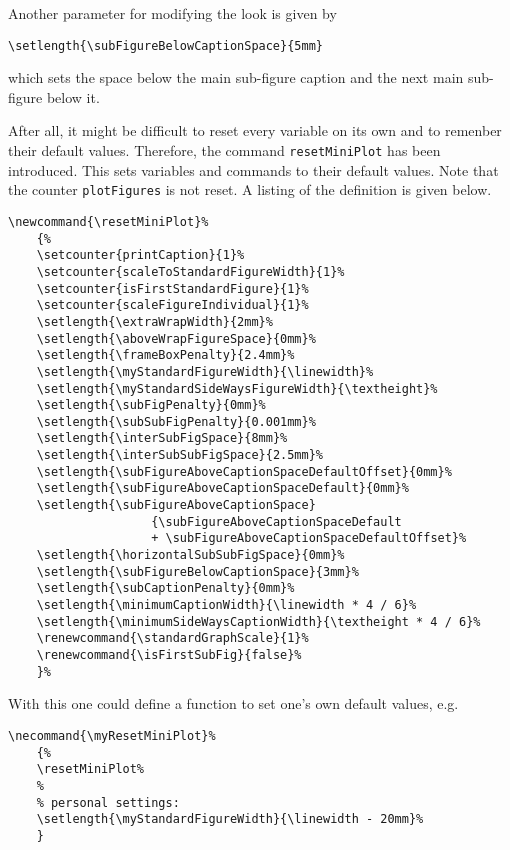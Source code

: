 \documentclass[12pt,a4paper]{article}
\newcommand{\comm}[1]{\texttt{#1}}
\begin{document}
Another parameter for modifying the look is given by

\begin{verbatim}
\setlength{\subFigureBelowCaptionSpace}{5mm}
\end{verbatim}

which sets the space below the main sub-figure caption and the next 
main sub-figure below it.

After all, it might be difficult to reset every variable on its 
own and to remenber their default values. Therefore, the 
command \comm{resetMiniPlot} has been introduced. This 
sets variables and commands to their default values. Note 
that the counter \comm{plotFigures} is not reset. A listing
of the definition is given below.


\begin{verbatim}
\newcommand{\resetMiniPlot}%
    {%
    \setcounter{printCaption}{1}%
    \setcounter{scaleToStandardFigureWidth}{1}%
    \setcounter{isFirstStandardFigure}{1}%
    \setcounter{scaleFigureIndividual}{1}%
    \setlength{\extraWrapWidth}{2mm}%    
    \setlength{\aboveWrapFigureSpace}{0mm}%
    \setlength{\frameBoxPenalty}{2.4mm}%
    \setlength{\myStandardFigureWidth}{\linewidth}%  
    \setlength{\myStandardSideWaysFigureWidth}{\textheight}%
    \setlength{\subFigPenalty}{0mm}%            
    \setlength{\subSubFigPenalty}{0.001mm}%
    \setlength{\interSubFigSpace}{8mm}%
    \setlength{\interSubSubFigSpace}{2.5mm}%
    \setlength{\subFigureAboveCaptionSpaceDefaultOffset}{0mm}%
    \setlength{\subFigureAboveCaptionSpaceDefault}{0mm}%
    \setlength{\subFigureAboveCaptionSpace}
                    {\subFigureAboveCaptionSpaceDefault
                    + \subFigureAboveCaptionSpaceDefaultOffset}%
    \setlength{\horizontalSubSubFigSpace}{0mm}%
    \setlength{\subFigureBelowCaptionSpace}{3mm}%
    \setlength{\subCaptionPenalty}{0mm}%
    \setlength{\minimumCaptionWidth}{\linewidth * 4 / 6}%
    \setlength{\minimumSideWaysCaptionWidth}{\textheight * 4 / 6}%
    \renewcommand{\standardGraphScale}{1}% 
    \renewcommand{\isFirstSubFig}{false}%
    }%
\end{verbatim}

With this one could define a function to set one's own default values, e.g.

\begin{verbatim}
\necommand{\myResetMiniPlot}%
    {%
    \resetMiniPlot%
    %
    % personal settings:
    \setlength{\myStandardFigureWidth}{\linewidth - 20mm}%  
    }
\end{verbatim}
\end{document}
